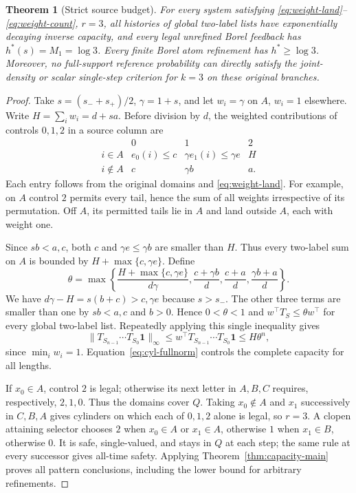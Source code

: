 \documentclass[11pt,reqno]{amsart}
\numberwithin{equation}{section}
\newtheorem{theorem}{Theorem}[section]
\theoremstyle{definition}
\newcommand{\one}{\mathbf 1}
\begin{document}
\begin{theorem}[Strict source budget]\label{thm:source-weight}
For every system satisfying \eqref{eq:weight-land}--\eqref{eq:weight-count},
$r=3$, all histories of global two-label lists have exponentially
decaying inverse capacity, and every legal unrefined Borel feedback
has $h^*(s)=M_1=\log3$. Every finite Borel atom refinement has
$h^*\ge\log3$. Moreover, no full-support reference probability
can directly satisfy the joint-density or scalar single-step
criterion for $k=3$ on these original branches.
\end{theorem}
\begin{proof}
Take $s=(s_-+s_+)/2$, $\gamma=1+s$, and let $w_i=\gamma$
on $A$, $w_i=1$ elsewhere. Write $H=\sum_iw_i=d+sa$.
Before division by $d$, the weighted contributions of controls
$0,1,2$ in a source column are
\[
\begin{array}{c|ccc}
 &0&1&2\\\hline
 i\in A&e_0(i)\le c&\gamma e_1(i)\le\gamma e&H\\
 i\notin A&c&\gamma b&a.
\end{array}
\]
Each entry follows from the original domains and
\eqref{eq:weight-land}. For example, on $A$ control $2$ permits
every tail, hence the sum of all weights irrespective of its
permutation. Off $A$, its permitted tails lie in $A$ and land
outside $A$, each with weight one.

Since $sb<a,c$, both $c$ and $\gamma e\le\gamma b$ are smaller
than $H$. Thus every two-label sum on $A$ is bounded by
$H+\max\{c,\gamma e\}$. Define
\[
 \theta=\max\left\{
 \frac{H+\max\{c,\gamma e\}}{d\gamma},
 \frac{c+\gamma b}{d},\frac{c+a}{d},\frac{\gamma b+a}{d}
 \right\}.
\]
We have $d\gamma-H=s(b+c)>c,\gamma e$ because $s>s_-$.
The other three terms are smaller than one by $sb<a,c$ and
$b>0$. Hence $0<\theta<1$ and
$w^\top T_S\le\theta w^\top$ for every global two-label list.
Repeatedly applying this single inequality gives
\[
 \|T_{S_{n-1}}\cdots T_{S_0}\one\|_\infty
 \le w^\top T_{S_{n-1}}\cdots T_{S_0}\one
 \le H\theta^n,
\]
since $\min_iw_i=1$. Equation~\eqref{eq:cyl-fullnorm} controls
the complete capacity for all lengths.

If $x_0\in A$, control $2$ is legal; otherwise its next letter
in $A,B,C$ requires, respectively, $2,1,0$. Thus the domains
cover $Q$. Taking $x_0\notin A$ and $x_1$ successively in
$C,B,A$ gives cylinders on which each of $0,1,2$ alone is legal,
so $r=3$. A clopen attaining selector chooses $2$ when $x_0\in A$
or $x_1\in A$, otherwise $1$ when $x_1\in B$, otherwise $0$.
It is safe, single-valued, and stays in $Q$ at each step; the same
rule at every successor gives all-time safety. Applying
Theorem~\ref{thm:capacity-main} proves all pattern conclusions,
including the lower bound for arbitrary refinements.


\end{proof}
\end{document}
